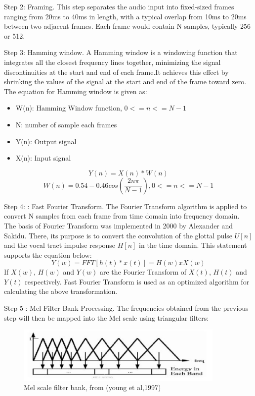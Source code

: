     Step 2: Framing. 
    This step separates the audio input into fixed-sized frames ranging from 20ms to 40ms in length, with a typical overlap from 10ms to 20ms between two adjacent frames. Each frame would contain N samples, typically 256 or 512.
    
    Step 3: Hamming window.
    A Hamming window is a windowing function that integrates all the closest frequency lines together, minimizing the signal discontinuities at the start and end of each frame.It achieves this effect by shrinking the values of the signal at the start and end of the frame toward zero. The equation for Hamming window is given as:
    \begin{itemize}
        \item W(n): Hamming Window function, $0<=n<=N - 1$
        \item N: number of sample each frames
        \item Y(n): Output signal
        \item X(n): Input signal
        
    \end{itemize}
    \begin{equation}
        Y(n) = X(n) * W(n)
    \end{equation}
    \begin{equation}
        W(n) = 0.54 - 0.46 cos(\frac{2n\pi}{N-1}), 0 <=n <= N-1 
    \end{equation}
    
    Step 4: : Fast Fourier Transform.
    The Fourier Transform algorithm is applied to convert N samples from each frame from time domain into frequency domain. The basis of Fourier Transform was implemented in 2000 by Alexander and Sakidu. \cite{ftbasis} There, its purpose is to convert the convolution of the glottal pulse $U[n]$ and the vocal tract impulse response $H[n]$ in the time domain. This statement supports the equation below:
    \begin{equation}
        Y(w) = FFT[h(t)*x(t)] = H(w) x X(w)
    \end{equation}
    If $X(w)$, $H(w)$ and $Y(w)$ are the Fourier Transform of $X(t)$, $H(t)$ and $Y(t)$ respectively. Fast Fourier Transform is used as an optimized algorithm for calculating the above transformation.
    
    Step 5 : Mel Filter Bank Processing.
    The frequencies obtained from the previous step will then be mapped into the Mel scale using triangular filters:
    \begin{figure}[h]
        \centering
        \includegraphics[width=0.9\textwidth]{img/Mel-scale-filter-bank-from-young-et-al-1997-6.png}
        \caption{Mel scale filter bank, from (young et al,1997)\cite{sharma}}
        \label{fig:melscale_filter}
    \end{figure}
    
